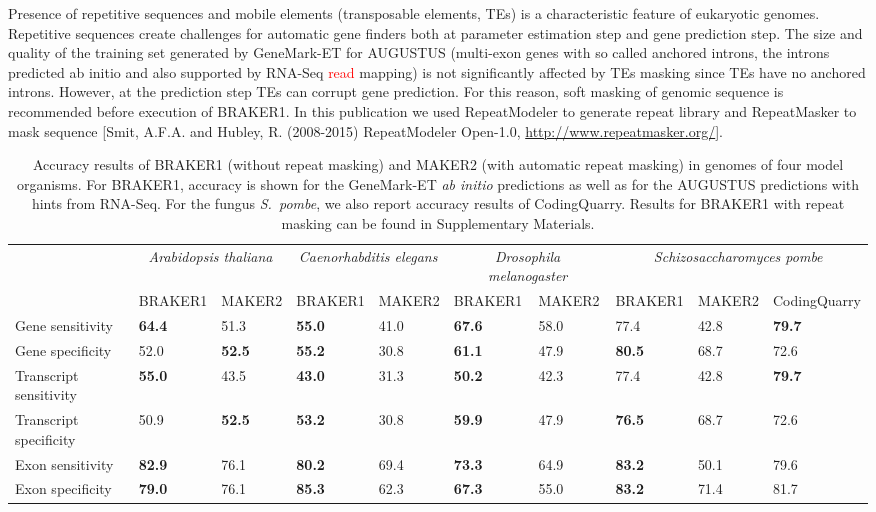\documentclass[a4paper,10pt]{article}
\begin{document}
Presence of repetitive sequences and mobile elements (transposable elements, TEs) is a characteristic feature of eukaryotic genomes. Repetitive sequences create challenges for automatic gene finders both at parameter estimation step and gene prediction step. The size and quality of the training set generated by GeneMark-ET for AUGUSTUS (multi-exon genes with so called anchored introns, the introns predicted ab initio and also supported by RNA-Seq \textcolor{red}{read} mapping) is not significantly affected by TEs masking since TEs have no anchored introns. However, at the prediction step TEs can corrupt gene prediction. For this reason, soft masking of genomic sequence is recommended before execution of BRAKER1. In this publication we used RepeatModeler to generate repeat library and RepeatMasker to mask sequence [Smit, A.F.A. and Hubley, R. (2008-2015) RepeatModeler Open-1.0, \url{http://www.repeatmasker.org/}].

\begin{table}
\caption{Accuracy results of BRAKER1 (without repeat masking) and MAKER2 (with automatic repeat masking) in genomes of four model organisms. For BRAKER1, accuracy is shown for the GeneMark-ET \textit{ab initio} predictions as well as for the AUGUSTUS predictions with hints from RNA-Seq. For the fungus \textit{S.~pombe}, we also report accuracy results of CodingQuarry. Results for BRAKER1 with repeat masking can be found in Supplementary Materials.\label{Tab:01}}
\begin{tabular}{lp{.9cm}p{.9cm}p{.9cm}p{.9cm}p{.9cm}p{.9cm}p{.9cm}p{.9cm}p{.9cm}}\hline
 & \multicolumn{2}{c}{\textit{Arabidopsis thaliana}} &  \multicolumn{2}{c}{\textit{Caenorhabditis elegans}} &  \multicolumn{2}{c}{\textit{Drosophila melanogaster}} &  \multicolumn{3}{c}{\textit{Schizosaccharomyces pombe}}\\
 & \tiny{BRAKER1} & \tiny{MAKER2} &  \tiny{BRAKER1} & \tiny{MAKER2}  & \tiny{BRAKER1} & \tiny{MAKER2} &\tiny{BRAKER1} & \tiny{MAKER2} &\tiny{CodingQuarry}\\
 \hline
Gene sensitivity        & \textbf{64.4} & 51.3          & \textbf{55.0} & 41.0 & \textbf{67.6} & 58.0 & 77.4 & 42.8 & \textbf{79.7}\\
Gene specificity        & 52.0          & \textbf{52.5} & \textbf{55.2} & 30.8 & \textbf{61.1} & 47.9 & \textbf{80.5} & 68.7 & 72.6\\
Transcript sensitivity  & \textbf{55.0} & 43.5          & \textbf{43.0} & 31.3 & \textbf{50.2} & 42.3 & 77.4 & 42.8 & \textbf{79.7}\\
Transcript specificity  & 50.9          & \textbf{52.5} & \textbf{53.2} & 30.8 & \textbf{59.9} & 47.9 & \textbf{76.5} & 68.7 & 72.6\\
Exon sensitivity        & \textbf{82.9} & 76.1          & \textbf{80.2} & 69.4 & \textbf{73.3} & 64.9 & \textbf{83.2} & 50.1 & 79.6\\
Exon specificity        & \textbf{79.0} & 76.1          & \textbf{85.3} & 62.3 & \textbf{67.3} & 55.0 & \textbf{83.2} & 71.4 & 81.7\\
\hline

\end{tabular}
\end{table}
\end{document}
